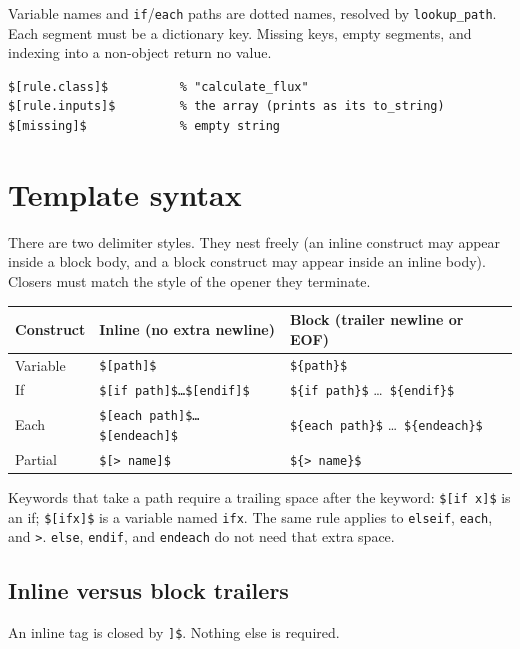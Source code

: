 \documentclass[11pt,letterpaper]{article}
\newcommand{\api}[1]{\texttt{#1}}
\begin{document}
Variable names and \texttt{if}/\texttt{each} paths are dotted names, resolved
by \api{lookup\_path}. Each segment must be a dictionary key. Missing keys,
empty segments, and indexing into a non-object return no value.

\begin{lstlisting}[style=tmpl]
$[rule.class]$          % "calculate_flux"
$[rule.inputs]$         % the array (prints as its to_string)
$[missing]$             % empty string
\end{lstlisting}

\section{Template syntax}

There are two delimiter styles. They nest freely (an inline construct may
appear inside a block body, and a block construct may appear inside an
inline body). Closers must match the style of the opener they terminate.

\begin{center}
\begin{tabularx}{\textwidth}{lXX}
\toprule
Construct & Inline (no extra newline) & Block (trailer newline or EOF) \\
\midrule
Variable & \texttt{\$[path]\$} & \texttt{\$\{path\}\$} \\
If & \texttt{\$[if path]\$\ldots\$[endif]\$} &
     \texttt{\$\{if path\}\$} \ldots\ \texttt{\$\{endif\}\$} \\
Each & \texttt{\$[each path]\$\ldots\$[endeach]\$} &
       \texttt{\$\{each path\}\$} \ldots\ \texttt{\$\{endeach\}\$} \\
Partial & \texttt{\$[> name]\$} & \texttt{\$\{> name\}\$} \\
\bottomrule
\end{tabularx}
\end{center}

Keywords that take a path require a trailing space after the keyword:
\texttt{\$[if x]\$} is an if; \texttt{\$[ifx]\$} is a variable named
\texttt{ifx}. The same rule applies to \texttt{elseif}, \texttt{each}, and
\texttt{>}. \texttt{else}, \texttt{endif}, and \texttt{endeach} do not need
that extra space.

\subsection{Inline versus block trailers}

An inline tag is closed by \texttt{]\$}. Nothing else is required.
\end{document}
